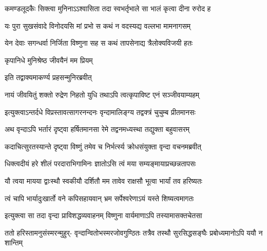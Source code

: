 \twolineshloka
{कमण्डलूदकैः सिक्त्वा मुनिनाऽऽश्वासिता तदा}
{स्वभर्तृभाले सा भालं कृत्वा दीना रुरोद ह} %


\twolineshloka
{यः पुरा सुखसंवादे विनोदयसि मां प्रभो}
{स कथं न वदस्यद्य वल्लभा मामनागसम्} %

\twolineshloka
{येन देवाः सगन्धर्वा निर्जिता विष्णुना सह}
{स कथं तापसेनाद्य त्रैलोक्यविजयी हतः} %





\onelineshloka
{कृपानिधे मुनिश्रेष्ठ जीवयैनं मम प्रियम्} %



\onelineshloka
{इति तद्वाक्यमाकर्ण्य प्रहसन्मुनिरब्रवीत्} %


\twolineshloka
{नायं जीवयितुं शक्तो रुद्रेण निहतो युधि}
{तथाऽपि त्वत्कृपाविष्ट एनं सञ्जीवयाम्यहम्} %



\twolineshloka
{इत्युक्त्वाऽन्तर्दधे विप्रस्तावत्सागरनन्दनः}
{वृन्दामालिङ्ग्य तद्वक्त्रं चुचुम्ब प्रीतमानसः} %

\twolineshloka
{अथ वृन्दाऽपि भर्तारं दृष्ट्वा हर्षितमानसा}
{रेमे तद्वनमध्यस्था तद्युक्ता बहुवासरम्} %

\twolineshloka
{कदाचित्सुरतस्यान्ते दृष्ट्वा विष्णुं तमेव च}
{निर्भर्त्स्य क्रोधसंयुक्ता वृन्दा वचनमब्रवीत्} %


\twolineshloka
{धिक्त्वदीयं हरे शीलं परदाराभिगामिनः}
{ज्ञातोऽसि त्वं मया सम्यङ्मायाप्रच्छन्नतापसः} %

\twolineshloka
{यौ त्वया मायया द्वाःस्थौ स्वकीयौ दर्शितौ मम}
{तावेव राक्षसौ भूत्वा भार्यां तव हरिष्यतः} %

\twolineshloka
{त्वं चापि भार्यादुःखार्तो वने कपिसहायवान्}
{भ्रम सर्पेश्वरेणाऽयं यस्ते शिष्यत्वमागतः} %

\twolineshloka
{इत्युक्त्वा सा तदा वृन्दा प्राविशद्धव्यवाहनम्}
{विष्णुना वार्यमाणाऽपि तस्यामासक्तचेतसा} %

\fourlineindentedshloka
{ततो हरिस्तामनुसंस्मरन्मुहुर्-}
{वृन्दान्वितोभस्मरजोवगुण्ठितः}
{तत्रैव तस्थौ सुरसिद्धसङ्घैः}
{प्रबोध्यमानोऽपि ययौ न शान्तिम्} %



